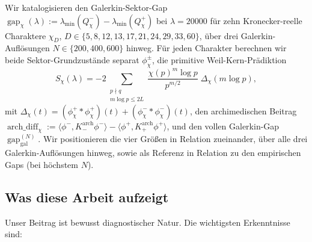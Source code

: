 \documentclass[10pt,twocolumn]{article}
\theoremstyle{definition}
\theoremstyle{remark}
\newcommand{\gap}{\operatorname{gap}}
\newcommand{\chifn}{\chi}
\newcommand{\Deltachi}{\Delta_{\chifn}}
\newcommand{\archdiff}{\operatorname{arch\_diff}}
\begin{document}
Wir katalogisieren den Galerkin-Sektor-Gap
$\gap_{\chifn}(\lambda)
  :=\lambda_{\min}(Q^-_{\chifn})-\lambda_{\min}(Q^+_{\chifn})$
bei $\lambda=20000$ für zehn Kronecker-reelle Charaktere
$\chi_D$, $D\in\{5,8,12,13,17,21,24,29,33,60\}$,
über drei Galerkin-Auflösungen $N\in\{200,400,600\}$ hinweg. Für jeden
Charakter berechnen wir beide Sektor-Grundzustände separat
$\phi^\pm_{\chifn}$, die primitive Weil-Kern-Prädiktion
\begin{equation}
\label{eq:predictor}
  S_{\chifn}(\lambda)
    = -2\sum_{\substack{p\nmid q\\m\log p\leq 2L}}
      \frac{\chifn(p)^m\log p}{p^{m/2}}\;\Deltachi(m\log p),
\end{equation}
mit
$\Deltachi(t)
  =(\phi^+_{\chifn}\!*\phi^+_{\chifn})(t)
    +(\phi^-_{\chifn}\!*\phi^-_{\chifn})(t)$,
den archimedischen Beitrag
$\archdiff_{\chifn}
  :=\langle\phi^-,K^{\mathrm{arch}}_-\phi^-\rangle
    -\langle\phi^+,K^{\mathrm{arch}}_+\phi^+\rangle$,
und den vollen Galerkin-Gap $\gap_{\mathrm{gal}}^{(N)}$. Wir positionieren die
vier Größen in Relation zueinander, über alle drei Galerkin-Auflösungen
hinweg, sowie als Referenz in Relation zu den empirischen Gaps (bei höchstem $N$).

\subsection{Was diese Arbeit aufzeigt}
\label{sec:intro-findings}

Unser Beitrag ist bewusst diagnostischer Natur. Die wichtigsten Erkenntnisse sind:
\end{document}
